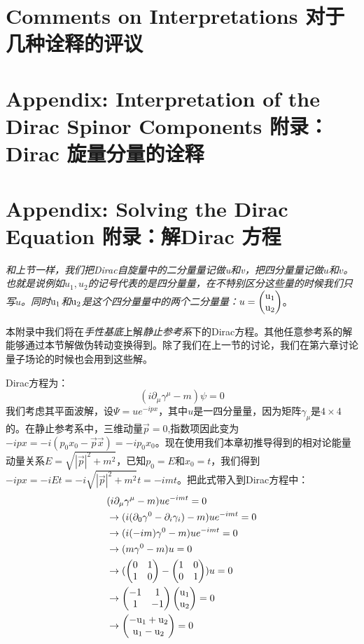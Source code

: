 \section[对于几种诠释的评议]{Comments on Interpretations 对于几种诠释的评议}\label{sec8.7}
\section[附录：Dirac 旋量分量的诠释]{Appendix: Interpretation of the Dirac Spinor Components 附录：Dirac 旋量分量的诠释}\label{sec8.8}

\section[附录：解Dirac 方程]{Appendix: Solving the Dirac Equation 附录：解Dirac 方程}\label{sec8.9}
{\it 和上节一样，我们把Dirac自旋量中的二分量量记做{\rm u}和{\rm v}，把四分量量记做$u$和$v$。也就是说例如$u_1,u_2$的记号代表的是四分量量，在不特别区分这些量的时候我们只写$u$。同时${\rm u_1}$和${\rm u_2}$是这个四分量量中的两个二分量量：$u=\begin{pmatrix} \rm u_1 \\ \rm u_2 \end{pmatrix} $}。
\par
本附录中我们将在{\it 手性基底}上解{\it 静止参考系}下的Dirac方程。其他任意参考系的解能够通过本节解做伪转动变换得到。除了我们在上一节的讨论，我们在第六章讨论量子场论的时候也会用到这些解。\par
Dirac方程为：
\begin{equation}
(i\partial_\mu \gamma^\mu -m)\psi=0
\end{equation}
我们考虑其平面波解，设$\Psi=ue^{-ipx}$，其中$u$是一四分量量，因为矩阵$\gamma_\mu$是$4 \times 4$的。在静止参考系中，三维动量$\vec{p}=0$,指数项因此变为$-ipx=-i(p_0x_0-\vec{p}\vec{x})=-ip_0x_0$。现在使用我们本章初推导得到的相对论能量动量关系$E=\sqrt{|\vec{p}|^2+m^2}$，已知$p_0=E$和$x_0=t$，我们得到$-ipx=-iEt=-i\sqrt{|\vec{p}|^2+m^2}t=-imt$。把此式带入到Dirac方程中：
\begin{equation}
\begin{split}
&(i\partial_\mu\gamma^\mu-m)ue^{-imt}=0\\
&\to (i(\partial_0\gamma^0-\partial_i\gamma_i)-m)ue^{-imt}=0\\
&\to (i(-im)\gamma^0-m)ue^{-imt}=0\\
&\to (m\gamma^0-m)u=0\\
&\to (\begin{pmatrix} 0 & 1 \\ 1 & 0 \end{pmatrix} -\begin{pmatrix} 1 & 0 \\ 0 & 1 \end{pmatrix})u=0\\
&\to \begin{pmatrix} -1 & 1 \\ 1 & -1 \end{pmatrix} \begin{pmatrix} \rm u_1 \\ \rm u_2 \end{pmatrix} =0\\
&\to \begin{pmatrix} \rm -u_1+u_2 \\ \rm u_1-u_2 \end{pmatrix} =0
\end{split}
\end{equation}
